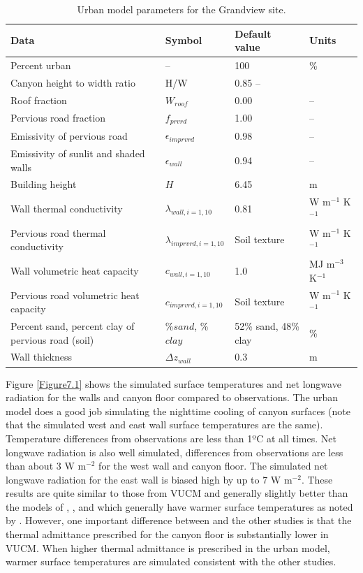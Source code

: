 \documentclass[12pt,authoryear]{elsarticle}
\numberwithin{equation}{section} %
\begin{document}
\begin{table}[h]
\centering
\caption{Urban model parameters for the Grandview site.}
\label{tab:urban_model_parameter_grandview}
\begin{tabular}{p{6cm}p{3cm}p{3cm}p{3cm}}
\hline
Data & Symbol & Default value & Units \\
\hline
Percent urban & -- & 100 & \% \\
Canyon height to width ratio & H/W & 0.85 -- \\
Roof fraction & $W_{roof}$ & 0.00 & -- \\
Pervious road fraction & $f_{prvrd}$ & 1.00 & -- \\
Emissivity of pervious road & $\epsilon_{imprvrd}$ & 0.98 & -- \\
Emissivity of sunlit and shaded walls & $\epsilon_{wall}$ & 0.94 & -- \\
Building height & $H$ & 6.45 & m \\
Wall thermal conductivity & $\lambda_{wall,i=1,10}$ & 0.81 & W m$^{-1}$ K$^{-1}$ \\
Pervious road thermal conductivity & $\lambda_{imprvrd,i=1,10}$ & Soil texture \citep{olesonTechnicalDescriptionCommunity2004} & W m$^{-1}$ K$^{-1}$ \\
Wall volumetric heat capacity & $c_{wall,i=1,10}$ & 1.0 & MJ m$^{-3}$ K$^{-1}$ \\
Pervious road volumetric heat capacity & $c_{imprvrd,i=1,10}$ & Soil texture \citep{olesonTechnicalDescriptionCommunity2004} & W m$^{-1}$ K$^{-1}$ \\
Percent sand, percent clay of pervious road (soil) & \%$sand$, \%$clay$ & 52\% sand, 48\% clay & \% \\
Wall thickness & $\Delta z_{wall}$ & 0.3 & m \\
\hline
\end{tabular}
\end{table}

Figure \ref{Figure7.1} shows the simulated surface temperatures and net longwave radiation for the walls and canyon floor compared to observations. The urban model does a good job simulating the nighttime cooling of canyon surfaces (note that the simulated west and east wall surface temperatures are the same). Temperature differences from observations are less than 1ºC at all times. Net longwave radiation is also well simulated, differences from observations are less than about 3 W m$^{-2}$ for the west wall and canyon floor. The simulated net longwave radiation for the east wall is biased high by up to 7 W m$^{-2}$. These results are quite similar to those from VUCM and generally slightly better than the models of \citep{massonPhysicallyBasedSchemeUrban2000}, \citep{johnsonSimulationSurfaceUrban1991}, and \citep{kusakaSimpleSingleLayerUrban2001} which generally have warmer surface temperatures as noted by \cite{leeVegetatedUrbanCanopy2008}. However,
one important difference between \cite{leeVegetatedUrbanCanopy2008} and the other studies is that the thermal admittance prescribed for the canyon floor is substantially lower in VUCM. When higher thermal admittance is prescribed in the urban model, warmer surface temperatures are simulated consistent with the other studies.
\end{document}
